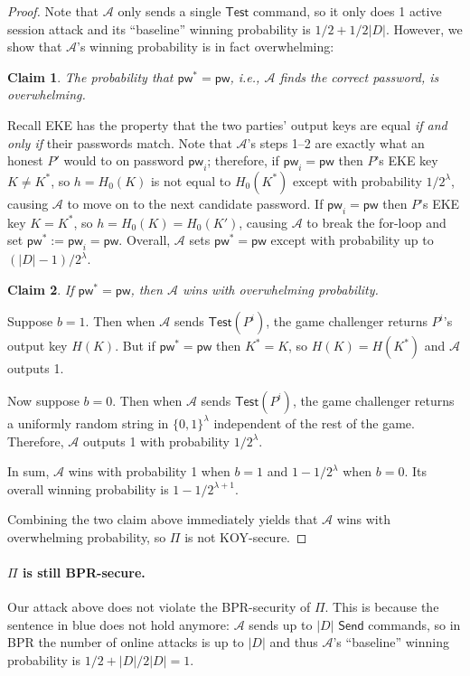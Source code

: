 \documentclass{article}
\newtheorem{claim}{Claim}
\newcommand{\adv}{\mathcal{A}}
\newcommand{\pw}{\mathsf{pw}}
\newcommand{\Send}{\mathsf{Send}}
\newcommand{\Test}{\mathsf{Test}}
\begin{document}
\begin{proof}
Note that {\color{blue}$\adv$ only sends a single $\Test$ command, so it only does 1 active session attack and its ``baseline'' winning probability is $1/2 + 1/2|D|$}. However, we show that $\adv$'s winning probability is in fact overwhelming:
\begin{claim}
The probability that $\pw^* = \pw$, i.e., $\adv$ finds the correct password, is overwhelming.
\end{claim}
Recall EKE has the property that the two parties' output keys are equal \emph{if and only if} their passwords match. Note that $\adv$'s steps 1--2 are exactly what an honest $P'$ would to on password $\pw_i$; therefore, if $\pw_i = \pw$ then $P$'s EKE key $K \neq K^*$, so $h = H_0(K)$ is not equal to $H_0(K^*)$ except with probability $1/2^\lambda$, causing $\adv$ to move on to the next candidate password. If $\pw_i = \pw$ then $P$'s EKE key $K = K^*$, so $h = H_0(K) = H_0(K')$, causing $\adv$ to break the for-loop and set $\pw^* := \pw_i = \pw$. Overall, $\adv$ sets $\pw^* = \pw$ except with probability up to $(|D|-1)/2^\lambda$.
\begin{claim}
If $\pw^* = \pw$, then $\adv$ wins with overwhelming probability.
\end{claim}
Suppose $b = 1$. Then when $\adv$ sends $\Test(P^i)$, the game challenger returns $P^i$'s output key $H(K)$. But if $\pw^* = \pw$ then $K^* = K$, so $H(K) = H(K^*)$ and $\adv$ outputs 1.

Now suppose $b = 0$. Then when $\adv$ sends $\Test(P^i)$, the game challenger returns a uniformly random string in $\{0,1\}^\lambda$ independent of the rest of the game. Therefore, $\adv$ outputs 1 with probability $1/2^\lambda$.

In sum, $\adv$ wins with probability 1 when $b = 1$ and $1-1/2^\lambda$ when $b = 0$. Its overall winning probability is $1-1/2^{\lambda+1}$.

\medskip
Combining the two claim above immediately yields that $\adv$ wins with overwhelming probability, so $\Pi$ is not KOY-secure.
\end{proof}
\paragraph{$\Pi$ is still BPR-secure.}
Our attack above does not violate the BPR-security of $\Pi$. This is because the sentence in blue does not hold anymore: $\adv$ sends up to $|D|$ $\Send$ commands, so in BPR the number of online attacks is up to $|D|$ and thus $\adv$'s ``baseline'' winning probability is $1/2 + |D|/2|D| = 1$.
\end{document}

